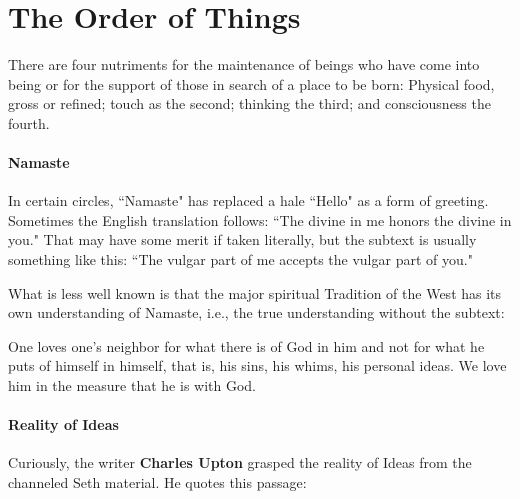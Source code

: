 \section{The Order of Things}

\begin{quotex}
There are four nutriments for the maintenance of beings who have come into being or for the support of those in search of a place to be born: Physical food, gross or refined; touch as the second; thinking the third; and consciousness the fourth. 

\end{quotex}
\paragraph{Namaste}
In certain circles, ``Namaste" has replaced a hale ``Hello" as a form of greeting. Sometimes the English translation follows: ``The divine in me honors the divine in you." That may have some merit if taken literally, but the subtext is usually something like this: ``The vulgar part of me accepts the vulgar part of you."

What is less well known is that the major spiritual Tradition of the West has its own understanding of Namaste, i.e., the true understanding without the subtext:

\begin{quotex}
One loves one's neighbor for what there is of God in him and not for what he puts of himself in himself, that is, his sins, his whims, his personal ideas. We love him in the measure that he is with God. 

\end{quotex}
\paragraph{Reality of Ideas}
Curiously, the writer \textbf{Charles Upton} grasped the reality of Ideas from the channeled Seth material. He quotes this passage:

